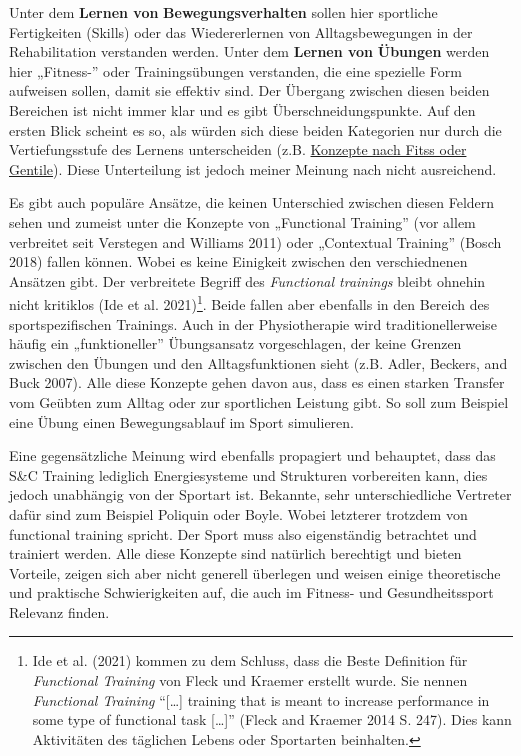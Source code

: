 \documentclass[
  letterpaper,
  DIV=11,
  numbers=noendperiod]{scrreprt}
\begin{document}
Unter dem \textbf{Lernen von} \textbf{Bewegungsverhalten} sollen hier
sportliche Fertigkeiten (Skills) oder das Wiedererlernen von
Alltagsbewegungen in der Rehabilitation verstanden werden. Unter dem
\textbf{Lernen von} \textbf{Übungen} werden hier „Fitness-'' oder
Trainingsübungen verstanden, die eine spezielle Form aufweisen sollen,
damit sie effektiv sind. Der Übergang zwischen diesen beiden Bereichen
ist nicht immer klar und es gibt Überschneidungspunkte. Auf den ersten
Blick scheint es so, als würden sich diese beiden Kategorien nur durch
die Vertiefungsstufe des Lernens unterscheiden (z.B.
\href{https://us.humankinetics.com/blogs/excerpt/understanding-motor-learning-stages-improves-skill-instruction}{Konzepte
nach Fitss oder Gentile}). Diese Unterteilung ist jedoch meiner Meinung
nach nicht ausreichend.

Es gibt auch populäre Ansätze, die keinen Unterschied zwischen diesen
Feldern sehen und zumeist unter die Konzepte von „Functional Training''
(vor allem verbreitet seit Verstegen and Williams 2011) oder „Contextual
Training'' (Bosch 2018) fallen können. Wobei es keine Einigkeit zwischen
den verschiednenen Ansätzen gibt. Der verbreitete Begriff des
\emph{Functional trainings} bleibt ohnehin nicht kritiklos (Ide et al.
2021)\footnote{Ide et al. (2021) kommen zu dem Schluss, dass die Beste
  Definition für \emph{Functional Training} von Fleck und Kraemer
  erstellt wurde. Sie nennen \emph{Functional Training} ``{[}\ldots{]}
  training that is meant to increase performance in some type of
  functional task {[}\ldots{]}'' (Fleck and Kraemer 2014 S. 247). Dies
  kann Aktivitäten des täglichen Lebens oder Sportarten beinhalten.}.
Beide fallen aber ebenfalls in den Bereich des sportspezifischen
Trainings. Auch in der Physiotherapie wird traditionellerweise häufig
ein „funktioneller'' Übungsansatz vorgeschlagen, der keine Grenzen
zwischen den Übungen und den Alltagsfunktionen sieht (z.B. Adler,
Beckers, and Buck 2007). Alle diese Konzepte gehen davon aus, dass es
einen starken Transfer vom Geübten zum Alltag oder zur sportlichen
Leistung gibt. So soll zum Beispiel eine Übung einen Bewegungsablauf im
Sport simulieren.

Eine gegensätzliche Meinung wird ebenfalls propagiert und behauptet,
dass das S\&C Training lediglich Energiesysteme und Strukturen
vorbereiten kann, dies jedoch unabhängig von der Sportart ist. Bekannte,
sehr unterschiedliche Vertreter dafür sind zum Beispiel Poliquin oder
Boyle. Wobei letzterer trotzdem von functional training spricht. Der
Sport muss also eigenständig betrachtet und trainiert werden. Alle diese
Konzepte sind natürlich berechtigt und bieten Vorteile, zeigen sich aber
nicht generell überlegen und weisen einige theoretische und praktische
Schwierigkeiten auf, die auch im Fitness- und Gesundheitssport Relevanz
finden.
\end{document}
